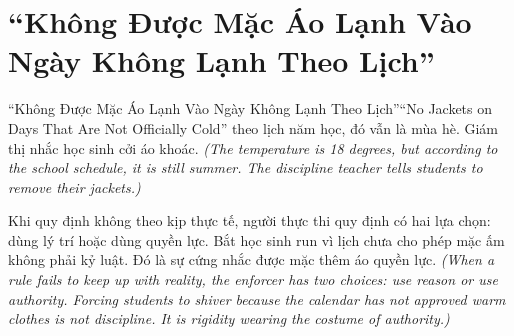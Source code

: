 \section{``Không Được Mặc Áo Lạnh Vào Ngày Không Lạnh Theo Lịch''}
\begin{truyen}{``Không Được Mặc Áo Lạnh Vào Ngày Không Lạnh Theo Lịch''}{``No Jackets on Days That Are Not Officially Cold''}
 theo lịch năm học, đó vẫn là mùa hè. Giám thị nhắc học sinh cởi áo khoác.
\textit{(The temperature is 18 degrees, but according to the school schedule, it is still summer. The discipline teacher tells students to remove their jackets.)}



\begin{baihoc}
Khi quy định không theo kịp thực tế, người thực thi quy định có hai lựa chọn: dùng lý trí hoặc dùng quyền lực. Bắt học sinh run vì lịch chưa cho phép mặc ấm không phải kỷ luật. Đó là sự cứng nhắc được mặc thêm áo quyền lực.
\textit{(When a rule fails to keep up with reality, the enforcer has two choices: use reason or use authority. Forcing students to shiver because the calendar has not approved warm clothes is not discipline. It is rigidity wearing the costume of authority.)}
\end{baihoc}
\end{truyen}

